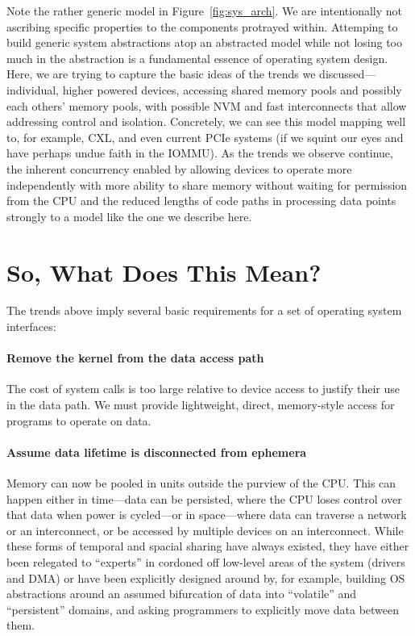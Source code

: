 Note the rather generic model in Figure~\ref{fig:sys_arch}. We are intentionally not ascribing specific properties to
the components protrayed within. Attemping to build generic system abstractions atop an abstracted model while not
losing too much in the abstraction is a fundamental essence of operating system design. Here, we are trying to capture
the basic ideas of the trends we discussed---individual, higher powered devices, accessing shared memory pools and
possibly each others' memory pools, with possible NVM and fast interconnects that allow addressing control and
isolation. Concretely, we can see this model mapping well to, for example, CXL, and even current PCIe systems (if we squint
our eyes
and have perhaps undue faith in the IOMMU). As the trends we observe continue, the inherent concurrency enabled by
allowing devices to operate more independently with more ability to share memory without waiting for permission from the
CPU and the reduced lengths of code paths in processing data points strongly to a model like the one we describe here.

\section{So, What Does This Mean?}

The trends above imply several basic requirements for a set of operating system interfaces:

\paragraph{Remove the kernel from the data access path} The cost of system calls is too large relative to device
access to justify their use in the data path. We must provide lightweight, direct, memory-style access for
programs to operate on data.

\paragraph{Assume data lifetime is disconnected from ephemera} Memory can now be pooled in units outside the
purview of the CPU. This can happen either in time---data can be persisted, where the CPU loses control over that
data when power is cycled---or in space---where data can traverse a network or an interconnect, or be accessed by
multiple devices on an interconnect. While these forms of temporal and spacial sharing have always existed, they
have either been relegated to ``experts'' in cordoned off low-level areas of the system (drivers and DMA) or have
been explicitly designed around by, for example, building OS abstractions around an assumed bifurcation of data into
``volatile'' and ``persistent'' domains, and asking programmers to explicitly move data between
them.

